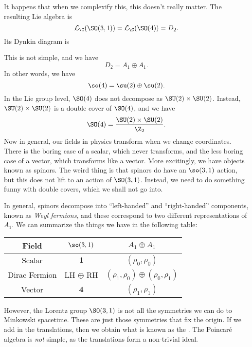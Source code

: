 \documentclass[a4paper]{article}
\begin{document}
It happens that when we complexify this, this doesn't really matter. The resulting Lie algebra is
\[
  \mathcal{L}_\C(\SO(3, 1)) = \mathcal{L}_\C(\SO(4)) = D_2.
\]
Its Dynkin diagram is
\begin{center}
\end{center}
This is not simple, and we have
\[
  D_2 = A_1 \oplus A_1.
\]
In other words, we have
\[
  \so(4) = \su(2) \oplus \su(2).
\]
In the Lie group level, $\SO(4)$ does not decompose as $\SU(2) \times \SU(2)$. Instead, $\SU(2) \times \SU(2)$ is a double cover of $\SO(4)$, and we have
\[
  \SO(4) = \frac{\SU(2) \times \SU(2)}{\Z_2}.
\]
Now in general, our fields in physics transform when we change coordinates. There is the boring case of a scalar, which never transforms, and the less boring case of a vector, which transforms like a vector. More excitingly, we have objects known as spinors. The weird thing is that spinors do have an $\so(3, 1)$ action, but this does not lift to an action of $\SO(3, 1)$. Instead, we need to do something funny with double covers, which we shall not go into.

In general, spinors decompose into ``left-handed'' and ``right-handed'' components, known as \emph{Weyl fermions}, and these correspond to two different representations of $A_1$. We can summarize the things we have in the following table:
\begin{center}
  \begin{tabular}{ccc}
    \toprule
    Field & $\so(3, 1)$ & $A_1 \oplus A_1$\\
    \midrule
    Scalar & $\mathbf{1}$ & $(\rho_0, \rho_0)$\\
    Dirac Fermion & LH $\oplus$ RH & $(\rho_1, \rho_0) \oplus (\rho_0, \rho_1)$\\
    Vector & $\mathbf{4}$ & $(\rho_1, \rho_1)$\\
    \bottomrule
  \end{tabular}
\end{center}
However, the Lorentz group $\SO(3, 1)$ is not all the symmetries we can do to Minkowski spacetime. These are just those symmetries that fix the origin. If we add in the translations, then we obtain what is known as the . The Poincar\'e algebra is \emph{not} simple, as the translations form a non-trivial ideal.
\end{document}
